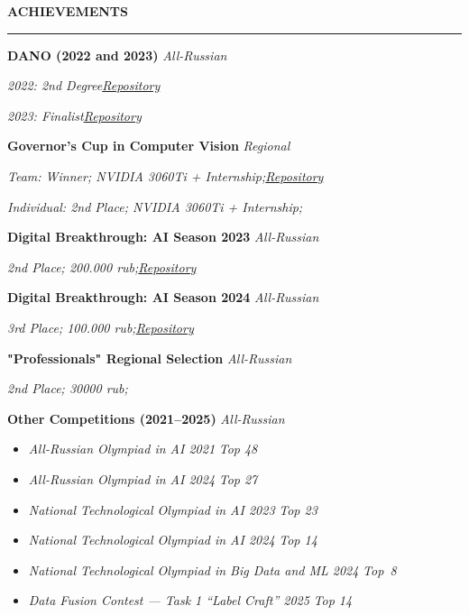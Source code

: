 \documentclass[10pt,a4paper]{article}
\newcommand{\sechead}[1]{%
  \noindent\textbf{#1}\par
  \vspace{-8pt}
  \noindent\rule{\linewidth}{0.4pt}\par\vspace{0.1cm}
}
\begin{document}
\sechead{ACHIEVEMENTS}

\textbf{DANO (2022 and 2023)} \hfill \emph{All-Russian}

\textit{2022: 2nd Degree}\hfill \emph{\href{https://github.com/D1ffic00lt/dano-olympiad-final-stage}{Repository}}\vspace{0cm}

\textit{2023: Finalist}\hfill \emph{\href{https://github.com/D1ffic00lt/dano-2023}{Repository}}\vspace{0.1cm}

\textbf{Governor’s Cup in Computer Vision} \hfill \emph{Regional}

\textit{Team: Winner; NVIDIA 3060Ti + Internship;}\hfill \emph{\href{https://github.com/D1ffic00lt/computer-vision-cup}{Repository}}\vspace{0cm}

\textit{Individual: 2nd Place; NVIDIA 3060Ti + Internship;}\vspace{0.1cm}


\textbf{Digital Breakthrough: AI Season 2023} \hfill \emph{All-Russian}

\textit{2nd Place; 200.000 rub;}\hfill \emph{\href{https://github.com/llitone/rutube-video-captioning}{Repository}}\vspace{0.1cm}


\textbf{Digital Breakthrough: AI Season 2024} \hfill \emph{All-Russian}

\textit{3rd Place; 100.000 rub;}\hfill \emph{\href{https://github.com/D1ffic00lt/Sky-Eye}{Repository}}\vspace{0.1cm}

\textbf{"Professionals" Regional Selection} \hfill \emph{All-Russian}

\textit{2nd Place; 30000 rub;}\vspace{0.1cm}

\textbf{Other Competitions (2021–2025)} \hfill \emph{All-Russian}

\begin{itemize}[
    label=$\cdot$, 
    itemsep=0.1em,
    topsep=0pt,
    parsep=0pt
]
    \item \textit{All-Russian Olympiad in AI 2021} \hfill \emph{Top 48}
    \item \textit{All-Russian Olympiad in AI 2024} \hfill \emph{Top 27}
    \item \textit{National Technological Olympiad in AI 2023} \hfill \emph{Top 23}
    \item \textit{National Technological Olympiad in AI 2024} \hfill \emph{Top 14}
    \item \textit{National Technological Olympiad in Big Data and ML 2024} \hfill \mbox{\emph{Top 8}\hspace{1ex}} 
    \item \textit{Data Fusion Contest — Task 1 “Label Craft” 2025} \hfill \emph{Top 14}
\end{itemize}\vspace{0.3cm}
\end{document}
